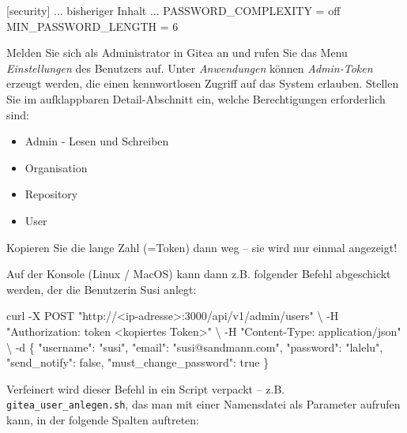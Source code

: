 \documentclass[
  letterpaper,
  DIV=11]{scrreprt}
\newenvironment{Shaded}{\begin{snugshade}}{\end{snugshade}}
\newcommand{\AttributeTok}[1]{\textcolor[rgb]{0.40,0.45,0.13}{#1}}
\newcommand{\DataTypeTok}[1]{\textcolor[rgb]{0.68,0.00,0.00}{#1}}
\newcommand{\ExtensionTok}[1]{\textcolor[rgb]{0.00,0.23,0.31}{#1}}
\newcommand{\NormalTok}[1]{\textcolor[rgb]{0.00,0.23,0.31}{#1}}
\newcommand{\StringTok}[1]{\textcolor[rgb]{0.13,0.47,0.30}{#1}}
\providecommand{\tightlist}{%
  \setlength{\itemsep}{0pt}\setlength{\parskip}{0pt}}\usepackage{longtable,booktabs,array}
\begin{document}
\begin{Shaded}
\begin{Highlighting}[]
\ExtensionTok{[security]}
\ExtensionTok{...}\NormalTok{ bisheriger Inhalt ...}
\ExtensionTok{PASSWORD\_COMPLEXITY}\NormalTok{ = off}
\ExtensionTok{MIN\_PASSWORD\_LENGTH}\NormalTok{ = 6}
\end{Highlighting}
\end{Shaded}

Melden Sie sich als Administrator in Gitea an und rufen Sie das Menu
\emph{Einstellungen} des Benutzers auf. Unter \emph{Anwendungen} können
\emph{Admin-Token} erzeugt werden, die einen kennwortlosen Zugriff auf
das System erlauben. Stellen Sie im aufklappbaren Detail-Abschnitt ein,
welche Berechtigungen erforderlich sind:

\begin{itemize}
\tightlist
\item
  Admin - Lesen und Schreiben
\item
  Organisation
\item
  Repository
\item
  User
\end{itemize}

Kopieren Sie die lange Zahl (=Token) dann weg -- sie wird nur einmal
angezeigt!

Auf der Konsole (Linux / MacOS) kann dann z.B. folgender Befehl
abgeschickt werden, der die Benutzerin Susi anlegt:

\begin{Shaded}
\begin{Highlighting}[]
\ExtensionTok{curl} \AttributeTok{{-}X}\NormalTok{ POST }\StringTok{"http://\textless{}ip{-}adresse\textgreater{}:3000/api/v1/admin/users"} \DataTypeTok{\textbackslash{}}
\NormalTok{{-}H }\StringTok{"Authorization: token \textless{}kopiertes Token\textgreater{}"} \DataTypeTok{\textbackslash{}}
\NormalTok{{-}H }\StringTok{"Content{-}Type: application/json"} \DataTypeTok{\textbackslash{}}
\NormalTok{{-}d }\StringTok{\textquotesingle{}\{}
\StringTok{  "username": "susi",}
\StringTok{  "email": "susi@sandmann.com",}
\StringTok{  "password": "lalelu",}
\StringTok{  "send\_notify": false,}
\StringTok{  "must\_change\_password": true}
\StringTok{\}\textquotesingle{}}
\end{Highlighting}
\end{Shaded}

Verfeinert wird dieser Befehl in ein Script verpackt -- z.B.
\texttt{gitea\_user\_anlegen.sh}, das man mit einer Namensdatei als
Parameter aufrufen kann, in der folgende Spalten auftreten:
\end{document}
